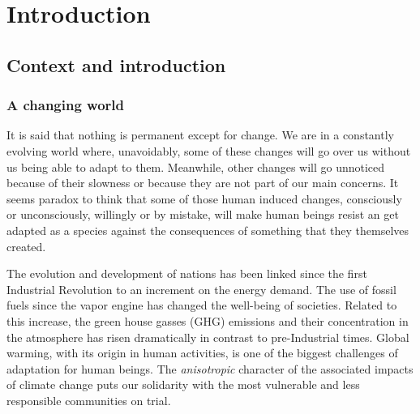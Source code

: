 


%



\part{Introduction\label{cha:intro}}

\chapter{Context and introduction\label{context}}


\section{A changing world} 



It is said that nothing is permanent except for change. We are in a constantly evolving world where, unavoidably, some of these changes will go over us without us  being able to adapt to them. Meanwhile, other changes will go unnoticed because of their slowness or because they are not part of our main concerns. It seems paradox to think that some of those human induced changes, consciously or unconsciously, willingly or by mistake, will make human beings resist an get adapted as a species against the consequences of something that they themselves created. 

The evolution and development of nations has been linked since the first Industrial Revolution to an increment on the energy demand. The use of fossil fuels since the vapor engine has changed the well-being of societies. Related to this increase, the green house gasses (GHG) emissions and their concentration in the atmosphere has risen dramatically in contrast to pre-Industrial times. Global warming, with its origin in human activities, is one of the biggest challenges of adaptation for human beings. The \textit{anisotropic} character of the associated impacts of climate change puts our solidarity with the most vulnerable and less responsible communities on trial.

